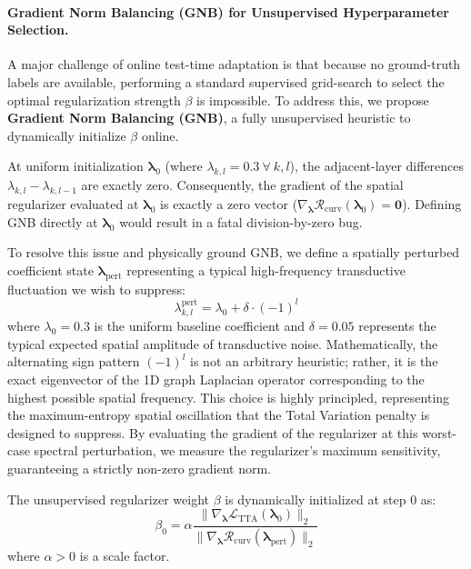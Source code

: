 \paragraph{Gradient Norm Balancing (GNB) for Unsupervised Hyperparameter Selection.}
A major challenge of online test-time adaptation is that because no ground-truth labels are available, performing a standard supervised grid-search to select the optimal regularization strength $\beta$ is impossible. To address this, we propose \textbf{Gradient Norm Balancing (GNB)}, a fully unsupervised heuristic to dynamically initialize $\beta$ online. 

At uniform initialization $\boldsymbol{\lambda}_0$ (where $\lambda_{k, l} = 0.3 \ \forall \ k, l$), the adjacent-layer differences $\lambda_{k, l} - \lambda_{k, l-1}$ are exactly zero. Consequently, the gradient of the spatial regularizer evaluated at $\boldsymbol{\lambda}_0$ is exactly a zero vector ($\nabla_{\boldsymbol{\lambda}} \mathcal{R}_{\text{curv}}(\boldsymbol{\lambda}_0) = \mathbf{0}$). Defining GNB directly at $\boldsymbol{\lambda}_0$ would result in a fatal division-by-zero bug.

To resolve this issue and physically ground GNB, we define a spatially perturbed coefficient state $\boldsymbol{\lambda}_{\text{pert}}$ representing a typical high-frequency transductive fluctuation we wish to suppress:
\begin{equation}
\lambda_{k, l}^{\text{pert}} = \lambda_{0} + \delta \cdot (-1)^l
\end{equation}
where $\lambda_0 = 0.3$ is the uniform baseline coefficient and $\delta = 0.05$ represents the typical expected spatial amplitude of transductive noise. Mathematically, the alternating sign pattern $(-1)^l$ is not an arbitrary heuristic; rather, it is the exact eigenvector of the 1D graph Laplacian operator corresponding to the highest possible spatial frequency. This choice is highly principled, representing the maximum-entropy spatial oscillation that the Total Variation penalty is designed to suppress. By evaluating the gradient of the regularizer at this worst-case spectral perturbation, we measure the regularizer's maximum sensitivity, guaranteeing a strictly non-zero gradient norm.

The unsupervised regularizer weight $\beta$ is dynamically initialized at step 0 as:
\begin{equation}
\label{eq:gnb}
\beta_0 = \alpha \frac{\|\nabla_{\boldsymbol{\lambda}} \mathcal{L}_{\text{TTA}}(\boldsymbol{\lambda}_0)\|_2}{\|\nabla_{\boldsymbol{\lambda}} \mathcal{R}_{\text{curv}}(\boldsymbol{\lambda}_{\text{pert}})\|_2}
\end{equation}
where $\alpha > 0$ is a scale factor.

